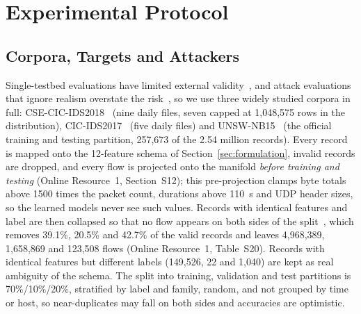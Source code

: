 \section{Experimental Protocol}
\label{sec:experiments}
\label{sec:empirical_evaluation}

\subsection{Corpora, Targets and Attackers}
\label{sec:setup}

Single-testbed evaluations have limited external validity~\cite{cantone2024crossdataset}, and attack evaluations that ignore realism overstate the risk~\cite{apruzzese2022modeling, apruzzese2023real}, so we use three widely studied corpora in full: CSE-CIC-IDS2018~\cite{sharafaldin2018toward} (nine daily files, seven capped at 1,048,575 rows in the distribution), CIC-IDS2017~\cite{sharafaldin2018toward} (five daily files) and UNSW-NB15~\cite{moustafa2015unsw} (the official training and testing partition, 257,673 of the 2.54 million records). Every record is mapped onto the 12-feature schema of Section~\ref{sec:formulation}, invalid records are dropped, and every flow is projected onto the manifold \emph{before training and testing} (Online Resource~1, Section~S12); this pre-projection clamps byte totals above 1500 times the packet count, durations above 110~s and UDP header sizes, so the learned models never see such values. Records with identical features and label are then collapsed so that no flow appears on both sides of the split~\cite{engelen2021troubleshooting, lanvin2023errors}, which removes 39.1\%, 20.5\% and 42.7\% of the valid records and leaves 4,968,389, 1,658,869 and 123,508 flows (Online Resource~1, Table~S20). Records with identical features but different labels (149,526, 22 and 1,040) are kept as real ambiguity of the schema. The split into training, validation and test partitions is 70\%/10\%/20\%, stratified by label and family, random, and not grouped by time or host, so near-duplicates may fall on both sides and accuracies are optimistic.

